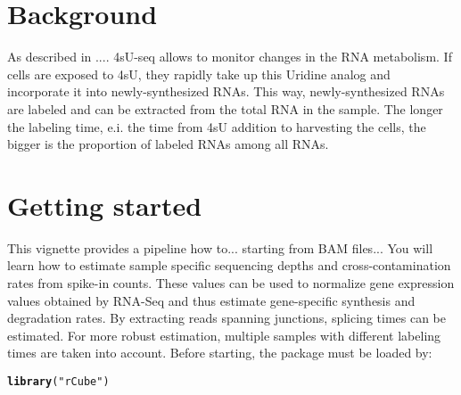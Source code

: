 \documentclass{article}\usepackage[]{graphicx}\usepackage[usenames,dvipsnames]{color}
\makeatletter
\newcommand{\hlstr}[1]{\textcolor[rgb]{0.192,0.494,0.8}{#1}}%
\newcommand{\hlstd}[1]{\textcolor[rgb]{0.345,0.345,0.345}{#1}}%
\newcommand{\hlkwd}[1]{\textcolor[rgb]{0.737,0.353,0.396}{\textbf{#1}}}%
\newenvironment{kframe}{%
 \def\at@end@of@kframe{}%
 \ifinner\ifhmode%
  \def\at@end@of@kframe{\end{minipage}}%
  \begin{minipage}{\columnwidth}%
 \fi\fi%
 \def\FrameCommand##1{\hskip\@totalleftmargin \hskip-\fboxsep
 \colorbox{shadecolor}{##1}\hskip-\fboxsep
     \hskip-\linewidth \hskip-\@totalleftmargin \hskip\columnwidth}%
 \MakeFramed {\advance\hsize-\width
   \@totalleftmargin\z@ \linewidth\hsize
   \@setminipage}}%
 {\par\unskip\endMakeFramed%
 \at@end@of@kframe}
\newenvironment{knitrout}{}{} %
\makeatother
\begin{document}
\tableofcontents


\section{Background}


As described in .... 4sU-seq allows to monitor changes in the RNA metabolism. If cells are exposed to 4sU, they rapidly take up this Uridine analog and incorporate it into newly-synthesized RNAs. This way, newly-synthesized RNAs are labeled and can be extracted from the total RNA in the sample. The longer the labeling time, e.i. the time from 4sU addition to harvesting the cells, the bigger is the proportion of labeled RNAs among all RNAs.

\section{Getting started} \label{GettingStarted}

This vignette provides a pipeline how to...
starting from BAM files...
You will learn how to estimate sample specific sequencing
depths and cross-contamination rates from spike-in counts. These values can be
used to normalize gene expression values obtained by RNA-Seq and thus estimate
gene-specific synthesis and degradation rates. 
By extracting reads spanning junctions, splicing times can be estimated. For 
more robust estimation, multiple samples with different labeling times are
taken into account.
Before starting, the package must be loaded by:

\begin{knitrout}
\color{fgcolor}\begin{kframe}
\begin{alltt}
\hlkwd{library}\hlstd{(}\hlstr{"rCube"}\hlstd{)}
\end{alltt}
\end{kframe}
\end{knitrout}
\end{document}
